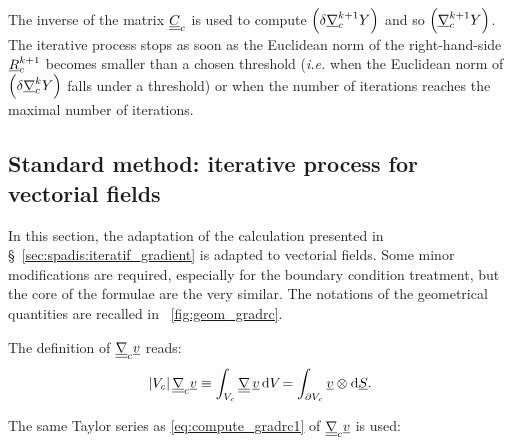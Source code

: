 The inverse of the matrix $\underline{\underline{C}}_{c}$ is used to compute $\left( \delta \underline{\nabla}_{c}^{k+1} Y \right)$
and so $\left( \underline{\nabla}^{k+1}_{c} Y \right)$. The iterative process stops as soon as the Euclidean norm of the right-hand-side $\underline{R}^{k+1}_{c}$ becomes smaller than a chosen threshold (\emph{i.e.} when the Euclidean norm
of $\left( \delta \underline{\nabla}^{k}_{c} Y \right)$ falls under a threshold) or when the number of iterations reaches the maximal number of iterations.

\subsection{Standard method: iterative process for vectorial fields}\label{sec:spadis:iteratif_gradient_vectors}
In this section, the adaptation of the calculation presented in \S~\ref{sec:spadis:iteratif_gradient} is adapted to
vectorial fields. Some minor modifications are required, especially for the boundary condition treatment, but the core of the
formulae are the very similar. The notations of the geometrical quantities are recalled in \figurename~\ref{fig:geom_gradrc}.

The definition of $\underline{\underline{{\nabla}}}_{c} \underline{v} $ reads:
\begin{equation}
\left| V_{c} \right| \underline{\underline{{\nabla}}}_{c} \underline{v} \equiv  \displaystyle \int_{V_{c}}{\underline{\underline{{\nabla}}} \, \underline{v} \, \mathrm{d} V_{} } = \int_{\partial V_{c}} \underline{v} \otimes \mathrm{d} \underline{S}.
\end{equation}

The same Taylor series as \eqref{eq:compute_gradrc1} of $\underline{\underline{{\nabla}}}_{c} \underline{v}$ is used:


